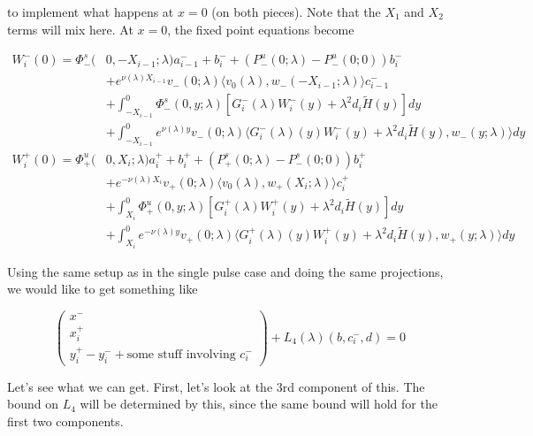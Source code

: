 \documentclass[12pt]{article}
\begin{document}
\begin{enumerate}
to implement what happens at $x = 0$ (on both pieces). Note that the $X_1$ and $X_2$ terms will mix here. At $x = 0$, the fixed point equations become

\begin{align*}
W_i^-(0) = \Phi^s_-(&0, -X_{i-1}; \lambda)a_{i-1}^- + b_i^- + (P^u_-(0; \lambda) - P^u_-(0; 0))b_i^- \\
&+ e^{\nu(\lambda)X_{i-1}} v_-(0; \lambda) \langle v_0(\lambda), w_-(-X_{i-1}; \lambda) \rangle c_{i-1}^- \\
&+ \int_{-X_{i-1}}^0 \Phi^s_-(0, y; \lambda) [ G_i^-(\lambda)W_i^-(y) + \lambda^2 d_i \tilde{H}(y) ] dy \\
&+ \int_{-X_{i-1}}^0
e^{\nu(\lambda)y} v_-(0; \lambda) \langle G_i^-(\lambda)(y)W_i^-(y) + \lambda^2 d_i \tilde{H}(y), w_-(y; \lambda) \rangle dy \\
W_i^+(0) = \Phi^u_+(&0, X_i; \lambda)a_i^+ + b_i^+ + (P^s_+(0; \lambda) - P^s_-(0; 0))b_i^+ \\
&+ e^{-\nu(\lambda) X_i} v_+(0; \lambda) \langle v_0(\lambda), w_+(X_i; \lambda) \rangle c_i^+ \\
&+ \int_{X_i}^0 \Phi^u_+(0, y; \lambda) [ G_i^+(\lambda)W_i^+(y) + \lambda^2 d_i \tilde{H}(y) ] dy \\
&+ \int_{X_i}^0 e^{-\nu(\lambda)y} v_+(0; \lambda) \langle G_i^+(\lambda)(y)W_i^+(y) + \lambda^2 d_i \tilde{H}(y), w_+(y; \lambda) \rangle dy
\end{align*}

Using the same setup as in the single pulse case and doing the same projections, we would like to get something like

\[
\begin{pmatrix}x^- \\ x_i^+ \\ y_i^+ - y_i^- + \text{some stuff involving $c_i^-$} \end{pmatrix}+ L_4(\lambda)(b, c_i^-,d) = 0
\]

Let's see what we can get. First, let's look at the 3rd component of this. The bound on $L_4$ will be determined by this, since the same bound will hold for the first two components.


\end{enumerate}
\end{document}

